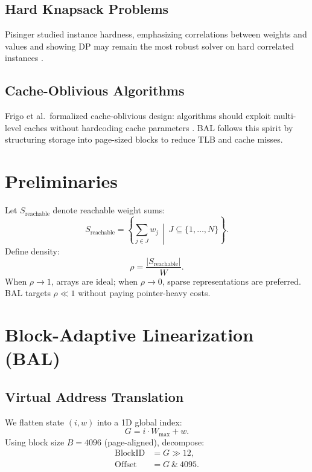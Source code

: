 \documentclass[a4paper,USenglish]{lipics-v2021}
\begin{document}
\subsection{Hard Knapsack Problems}
Pisinger studied instance hardness, emphasizing correlations between weights and values and showing DP may remain the most robust solver on hard correlated instances \cite{pisinger2005}.

\subsection{Cache-Oblivious Algorithms}
Frigo et al.\ formalized cache-oblivious design: algorithms should exploit multi-level caches without hardcoding cache parameters \cite{frigo1999}. BAL follows this spirit by structuring storage into page-sized blocks to reduce TLB and cache misses.

\section{Preliminaries}
Let $S_{\text{reachable}}$ denote reachable weight sums:
\begin{equation}
S_{\text{reachable}} = \left\{ \sum_{j \in J} w_j \,\middle|\, J \subseteq \{1,\dots,N\} \right\}.
\end{equation}
Define density:
\begin{equation}
\rho = \frac{|S_{\text{reachable}}|}{W}.
\end{equation}
When $\rho\to 1$, arrays are ideal; when $\rho\to 0$, sparse representations are preferred. BAL targets $\rho\ll 1$ without paying pointer-heavy costs.

\section{Block-Adaptive Linearization (BAL)}
\subsection{Virtual Address Translation}
We flatten state $(i,w)$ into a 1D global index:
\begin{equation}
G = i\cdot W_{\max} + w.
\end{equation}
Using block size $B=4096$ (page-aligned), decompose:
\begin{align}
\text{BlockID} &= G \gg 12,\\
\text{Offset}  &= G \ \&\ 4095.
\end{align}
\end{document}
